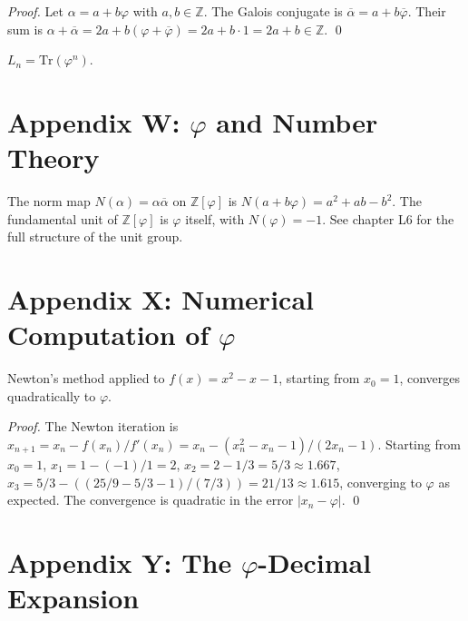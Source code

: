 \begin{proof}
Let $\alpha = a + b \varphi$ with $a, b \in \mathbb{Z}$. The Galois
conjugate is $\overline{\alpha} = a + b \overline{\varphi}$. Their
sum is $\alpha + \overline{\alpha} = 2a + b (\varphi +
\overline{\varphi}) = 2a + b \cdot 1 = 2a + b \in \mathbb{Z}$.
\qed
\end{proof}

\begin{corollary}\label{cor:01-lucas-as-trace}
$L_n = \mathrm{Tr}(\varphi^n)$.
\end{corollary}

\section*{Appendix W: $\varphi$ and Number Theory}
\label{fa_01:sec:01-app-W}

The norm map $N(\alpha) = \alpha \overline{\alpha}$ on
$\mathbb{Z}[\varphi]$ is $N(a + b\varphi) = a^2 + ab - b^2$. The
fundamental unit of $\mathbb{Z}[\varphi]$ is $\varphi$ itself, with
$N(\varphi) = -1$. See chapter L6 for the full structure of the
unit group.

\section*{Appendix X: Numerical Computation of $\varphi$}
\label{fa_01:sec:01-app-X}

\begin{lemma}
\label{fa_01:lem:01-newton-phi}
Newton's method applied to $f(x) = x^2 - x - 1$, starting from
$x_0 = 1$, converges quadratically to $\varphi$.
\end{lemma}

\begin{proof}
The Newton iteration is $x_{n+1} = x_n - f(x_n)/f'(x_n) = x_n -
(x_n^2 - x_n - 1)/(2 x_n - 1)$. Starting from $x_0 = 1$,
$x_1 = 1 - (-1)/1 = 2$, $x_2 = 2 - 1/3 = 5/3 \approx 1.667$,
$x_3 = 5/3 - ((25/9 - 5/3 - 1)/(7/3)) = 21/13 \approx 1.615$,
converging to $\varphi$ as expected. The convergence is quadratic
in the error $|x_n - \varphi|$.
\qed
\end{proof}

\section*{Appendix Y: The $\varphi$-Decimal Expansion}
\label{fa_01:sec:01-app-Y}

